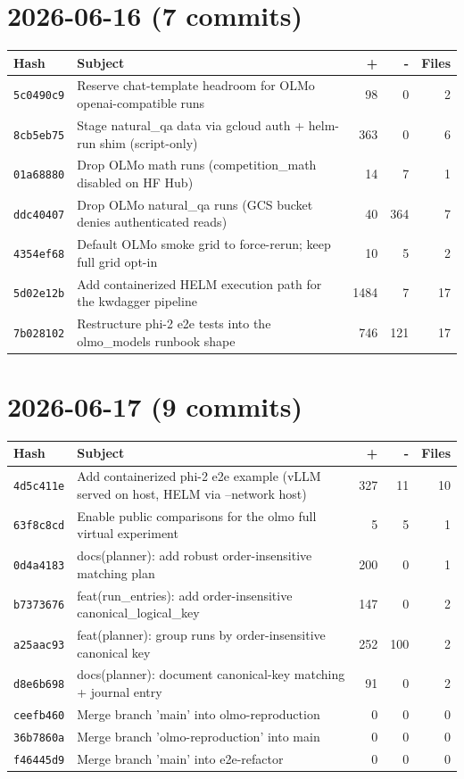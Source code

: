 \section*{2026-06-16 (7 commits)}
\begin{longtable}{@{}p{}p{}r r r@{}}
\toprule Hash & Subject & + & - & Files \\ \midrule\endhead
\texttt{5c0490c9} & Reserve chat-template headroom for OLMo openai-compatible runs & 98 & 0 & 2 \\
\texttt{8cb5eb75} & Stage natural\_qa data via gcloud auth + helm-run shim (script-only) & 363 & 0 & 6 \\
\texttt{01a68880} & Drop OLMo math runs (competition\_math disabled on HF Hub) & 14 & 7 & 1 \\
\texttt{ddc40407} & Drop OLMo natural\_qa runs (GCS bucket denies authenticated reads) & 40 & 364 & 7 \\
\texttt{4354ef68} & Default OLMo smoke grid to force-rerun; keep full grid opt-in & 10 & 5 & 2 \\
\texttt{5d02e12b} & Add containerized HELM execution path for the kwdagger pipeline & 1484 & 7 & 17 \\
\texttt{7b028102} & Restructure phi-2 e2e tests into the olmo\_models runbook shape & 746 & 121 & 17 \\
\bottomrule\end{longtable}
\section*{2026-06-17 (9 commits)}
\begin{longtable}{@{}p{}p{}r r r@{}}
\toprule Hash & Subject & + & - & Files \\ \midrule\endhead
\texttt{4d5c411e} & Add containerized phi-2 e2e example (vLLM served on host, HELM via --network host) & 327 & 11 & 10 \\
\texttt{63f8c8cd} & Enable public comparisons for the olmo full virtual experiment & 5 & 5 & 1 \\
\texttt{0d4a4183} & docs(planner): add robust order-insensitive matching plan & 200 & 0 & 1 \\
\texttt{b7373676} & feat(run\_entries): add order-insensitive canonical\_logical\_key & 147 & 0 & 2 \\
\texttt{a25aac93} & feat(planner): group runs by order-insensitive canonical key & 252 & 100 & 2 \\
\texttt{d8e6b698} & docs(planner): document canonical-key matching + journal entry & 91 & 0 & 2 \\
\texttt{ceefb460} & Merge branch 'main' into olmo-reproduction & 0 & 0 & 0 \\
\texttt{36b7860a} & Merge branch 'olmo-reproduction' into main & 0 & 0 & 0 \\
\texttt{f46445d9} & Merge branch 'main' into e2e-refactor & 0 & 0 & 0 \\
\bottomrule\end{longtable}
